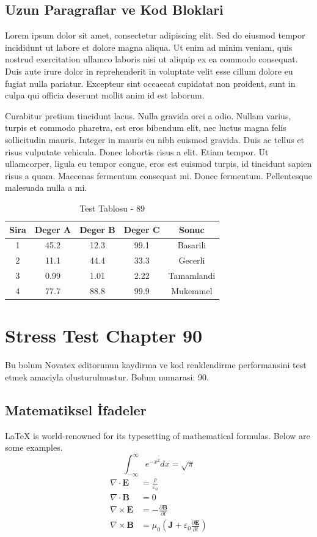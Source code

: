 \documentclass[12pt,a4paper]{article}
\begin{document}
\subsection{Uzun Paragraflar ve Kod Bloklari}
Lorem ipsum dolor sit amet, consectetur adipiscing elit. Sed do eiusmod tempor incididunt ut labore et dolore magna aliqua. Ut enim ad minim veniam, quis nostrud exercitation ullamco laboris nisi ut aliquip ex ea commodo consequat. Duis aute irure dolor in reprehenderit in voluptate velit esse cillum dolore eu fugiat nulla pariatur. Excepteur sint occaecat cupidatat non proident, sunt in culpa qui officia deserunt mollit anim id est laborum.

Curabitur pretium tincidunt lacus. Nulla gravida orci a odio. Nullam varius, turpis et commodo pharetra, est eros bibendum elit, nec luctus magna felis sollicitudin mauris. Integer in mauris eu nibh euismod gravida. Duis ac tellus et risus vulputate vehicula. Donec lobortis risus a elit. Etiam tempor. Ut ullamcorper, ligula eu tempor congue, eros est euismod turpis, id tincidunt sapien risus a quam. Maecenas fermentum consequat mi. Donec fermentum. Pellentesque malesuada nulla a mi.

\begin{table}[h!]
\centering
\begin{tabular}{|c|c|c|c|c|}
\hline
\textbf{Sira} & \textbf{Deger A} & \textbf{Deger B} & \textbf{Deger C} & \textbf{Sonuc} \\
\hline
1 & 45.2 & 12.3 & 99.1 & Basarili \\
2 & 11.1 & 44.4 & 33.3 & Gecerli \\
3 & 0.99 & 1.01 & 2.22 & Tamamlandi \\
4 & 77.7 & 88.8 & 99.9 & Mukemmel \\
\hline
\end{tabular}
\caption{Test Tablosu - 89}
\end{table}

\newpage
\section{Stress Test Chapter 90}
Bu bolum Novatex editorunun kaydirma ve kod renklendirme performansini test etmek amaciyla olusturulmustur. Bolum numarasi: 90.

\subsection{Matematiksel İfadeler}
\LaTeX{} is world-renowned for its typesetting of mathematical formulas. Below are some examples.
\begin{equation}
\int_{-\infty}^{\infty} e^{-x^2} dx = \sqrt{\pi}
\end{equation}
\begin{align}
\nabla \cdot \mathbf{E} &= \frac{\rho}{\varepsilon_0} \\
\nabla \cdot \mathbf{B} &= 0 \\
\nabla \times \mathbf{E} &= -\frac{\partial \mathbf{B}}{\partial t} \\
\nabla \times \mathbf{B} &= \mu_0\left(\mathbf{J} + \varepsilon_0 \frac{\partial \mathbf{E}}{\partial t}\right)
\end{align}
\end{document}
